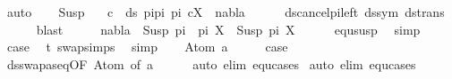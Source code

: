 \begin{isabellebody}
\ auto\isanewline
\ \ \isamarkupfalse%
\ Susp\ \isamarkupfalse%
\ {\isachardoublequoteopen}{\isasymforall}\ c\ {\isasymin}\ ds\ {\isacharparenleft}{\kern0pt}pi{}{\isacharat}{\kern0pt}pi{\isacharparenright}{\kern0pt}\ pi{\isacharprime}{\kern0pt}{\isachardot}{\kern0pt}\ {\isacharparenleft}{\kern0pt}c{\isacharcomma}{\kern0pt}X{\isacharparenright}{\kern0pt}\ {\isasymin}\ nabla{\isachardoublequoteclose}\isanewline
\ \ \ \ \isamarkupfalse%
\ ds{\isacharunderscore}{\kern0pt}cancel{\isacharunderscore}{\kern0pt}pi{\isacharunderscore}{\kern0pt}left\ ds{\isacharunderscore}{\kern0pt}sym\ ds{\isacharunderscore}{\kern0pt}trans\isanewline
\ \ \ \ \isamarkupfalse%
\ blast\isanewline
\ \ \isamarkupfalse%
\ \isamarkupfalse%
\ {\isachardoublequoteopen}nabla\ {\isasymturnstile}\ Susp\ {\isacharparenleft}{\kern0pt}pi{}\ {\isacharat}{\kern0pt}\ pi{\isacharparenright}{\kern0pt}\ X\ {\isasymapprox}\ Susp\ pi{\isacharprime}{\kern0pt}\ X{\isachardoublequoteclose}\isanewline
\ \ \ \ \isamarkupfalse%
\ equ{\isacharunderscore}{\kern0pt}susp\ \isamarkupfalse%
\ simp\isanewline
\ \ \isamarkupfalse%
\ \isamarkupfalse%
\ {\isacharquery}{\kern0pt}case\ \isamarkupfalse%
\ t{}\ swap{\isachardot}{\kern0pt}simps{\isacharparenleft}{\kern0pt}{}{\isacharparenright}{\kern0pt}\ \isamarkupfalse%
\ simp\isanewline
{}\isamarkupfalse%
\isanewline
\ \ \isamarkupfalse%
\ {\isacharparenleft}{\kern0pt}Atom\ a{\isacharparenright}{\kern0pt}\isanewline
\ \ \isamarkupfalse%
\ \isamarkupfalse%
\ {\isacharquery}{\kern0pt}case\isanewline
\ \ \ \ \isamarkupfalse%
\ ds{\isacharunderscore}{\kern0pt}swapas{\isacharunderscore}{\kern0pt}eq{\isacharbrackleft}{\kern0pt}OF\ Atom{\isacharparenleft}{\kern0pt}{}{\isacharparenright}{\kern0pt}{\isacharcomma}{\kern0pt}\ of\ a{\isacharbrackright}{\kern0pt}\isanewline
\ \ \ \ \isamarkupfalse%
\ {\isacharparenleft}{\kern0pt}auto\ elim{\isacharcolon}{\kern0pt}\ equ{\isachardot}{\kern0pt}cases{\isacharparenright}{\kern0pt}\isanewline
{}\isamarkupfalse%
\ {\isacharparenleft}{\kern0pt}auto\ elim{\isacharcolon}{\kern0pt}\ equ{\isachardot}{\kern0pt}cases{\isacharparenright}{\kern0pt}%
\endisatagproof
{\isafoldproof}%
%
\isadelimproof
\isanewline
%
\endisadelimproof

\end{isabellebody}
